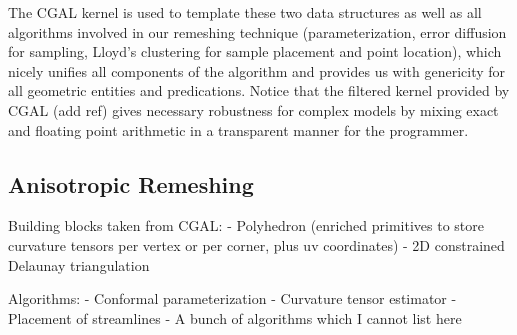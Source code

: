 The CGAL kernel is used to template these two data structures as well
as all algorithms involved in our remeshing technique
(parameterization, error diffusion for sampling, Lloyd's clustering
for sample placement and point location), which nicely unifies all
components of the algorithm and provides us with genericity for all
geometric entities and predications. Notice that the filtered kernel
provided by CGAL (add ref) gives necessary robustness for complex
models by mixing exact and floating point arithmetic in a transparent
manner for the programmer.

\subsection{Anisotropic Remeshing}

Building blocks taken from CGAL:
- Polyhedron (enriched primitives to store curvature tensors per
vertex or per corner, plus uv coordinates)
- 2D constrained Delaunay triangulation

Algorithms:
- Conformal parameterization
- Curvature tensor estimator
- Placement of streamlines
- A bunch of algorithms which I cannot list here

